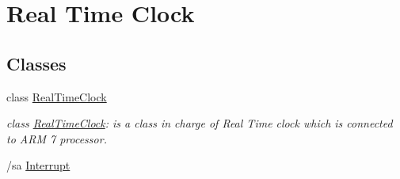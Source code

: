 \hypertarget{group__group9}{
\section{Real Time Clock}
\label{group__group9}
}
\subsection*{Classes}
\begin{DoxyCompactItemize}
\item 
class \hyperlink{class_real_time_clock}{RealTimeClock}
\begin{DoxyCompactList}\small\item\em class \hyperlink{class_real_time_clock}{RealTimeClock}: is a class in charge of Real Time clock which is connected to ARM 7 processor.

/sa \hyperlink{class_interrupt}{Interrupt} \end{DoxyCompactList}\end{DoxyCompactItemize}
